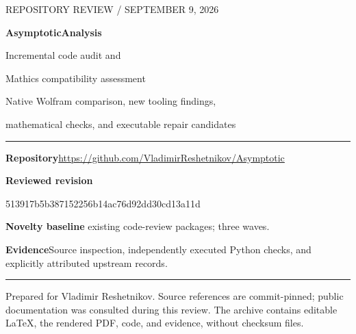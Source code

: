 \documentclass[11pt,letterpaper]{article}
\newcommand{\commit}{513917b5b387152256b14ac76d92dd30cd13a11d}
\begin{document}
\begin{titlepage}
\vspace*{0.55in}
{\large\sffamily\textcolor{ink}{REPOSITORY REVIEW / SEPTEMBER 9, 2026}}\par
\vspace{0.3in}
{\Huge\bfseries\sffamily AsymptoticAnalysis}\par
\vspace{0.13in}
{\LARGE\sffamily Incremental code audit and\par Mathics compatibility assessment}\par
\vspace{0.35in}
{\large Native Wolfram comparison, new tooling findings,\par mathematical checks, and executable repair candidates}\par
\vspace{0.45in}
\hrule
\vspace{0.16in}
\textbf{Repository}\quad \url{https://github.com/VladimirReshetnikov/Asymptotic}\par
\textbf{Reviewed revision}\par
{\small\ttfamily\commit}\par
\textbf{Novelty baseline} existing code-review packages; three waves.\par
\textbf{Evidence}\quad Source inspection, independently executed Python checks, and explicitly attributed upstream records.\par
\vspace{0.16in}
\hrule
\vspace{0.35in}
\begin{abstract}
This review evaluates the package as an asymptotic computation system and as a cross-interpreter software artifact. Its distinctive value is the combination of ordered real scales, retained branch information, structured remainders, and specialized inverse cores, not an absence of native Wolfram series or inversion facilities. The incremental findings concern code added after the most recent prior-review snapshot: interpreter-path normalization that escapes a POSIX virtual environment, incomplete timeout validation, exhaustive search inside a first-position adapter, and unbounded diagnostic capture. Two additional Mathics adapter questions are retained as unexecuted audit candidates rather than demonstrated mathematical failures. The accompanying code supplies tested Python corrections, a bounded-output prototype, exact independent mathematical checks, and focused interpreter characterization scripts.

\textbf{Execution boundary.} Twenty Python unit tests passed. No fresh Wolfram or Mathics execution of the package succeeded in this review environment. The article does not claim a new observed wrong public asymptotic formula or a complete compatibility certification.
\end{abstract}
\vfill
{\small Prepared for Vladimir Reshetnikov. Source references are commit-pinned; public documentation was consulted during this review. The archive contains editable LaTeX, the rendered PDF, code, and evidence, without checksum files.}
\end{titlepage}
\tableofcontents
\newpage
\end{document}

